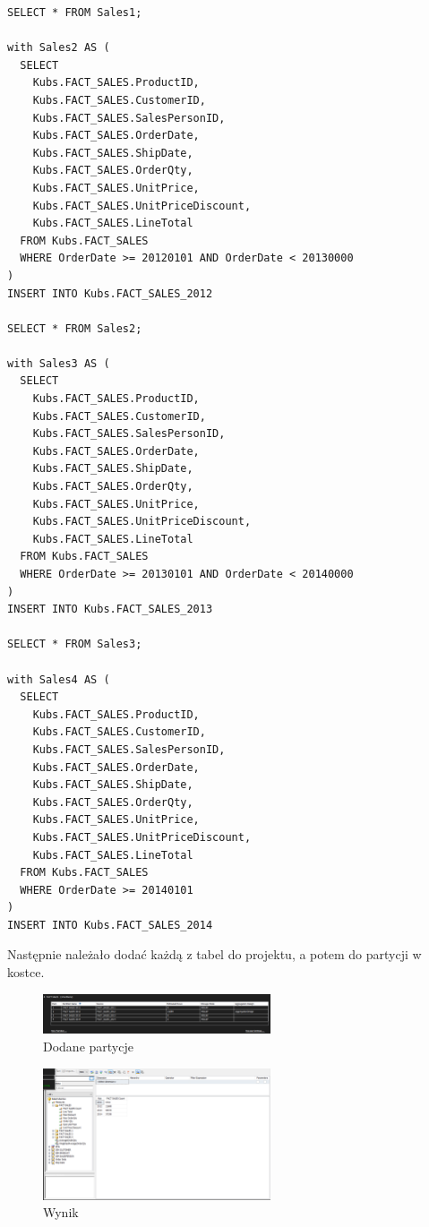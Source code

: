 \documentclass[a4paper,12pt]{article}
\begin{document}
\begin{lstlisting}[caption={Tworzenie i wypełnianie tabeli DIM\_TIME.}]
SELECT * FROM Sales1;

with Sales2 AS (
  SELECT 
    Kubs.FACT_SALES.ProductID,
    Kubs.FACT_SALES.CustomerID,
    Kubs.FACT_SALES.SalesPersonID,
    Kubs.FACT_SALES.OrderDate,
    Kubs.FACT_SALES.ShipDate,
    Kubs.FACT_SALES.OrderQty,
    Kubs.FACT_SALES.UnitPrice,
    Kubs.FACT_SALES.UnitPriceDiscount,
    Kubs.FACT_SALES.LineTotal
  FROM Kubs.FACT_SALES
  WHERE OrderDate >= 20120101 AND OrderDate < 20130000
)
INSERT INTO Kubs.FACT_SALES_2012

SELECT * FROM Sales2;

with Sales3 AS (
  SELECT 
    Kubs.FACT_SALES.ProductID,
    Kubs.FACT_SALES.CustomerID,
    Kubs.FACT_SALES.SalesPersonID,
    Kubs.FACT_SALES.OrderDate,
    Kubs.FACT_SALES.ShipDate,
    Kubs.FACT_SALES.OrderQty,
    Kubs.FACT_SALES.UnitPrice,
    Kubs.FACT_SALES.UnitPriceDiscount,
    Kubs.FACT_SALES.LineTotal
  FROM Kubs.FACT_SALES
  WHERE OrderDate >= 20130101 AND OrderDate < 20140000
)
INSERT INTO Kubs.FACT_SALES_2013

SELECT * FROM Sales3;

with Sales4 AS (
  SELECT 
    Kubs.FACT_SALES.ProductID,
    Kubs.FACT_SALES.CustomerID,
    Kubs.FACT_SALES.SalesPersonID,
    Kubs.FACT_SALES.OrderDate,
    Kubs.FACT_SALES.ShipDate,
    Kubs.FACT_SALES.OrderQty,
    Kubs.FACT_SALES.UnitPrice,
    Kubs.FACT_SALES.UnitPriceDiscount,
    Kubs.FACT_SALES.LineTotal
  FROM Kubs.FACT_SALES
  WHERE OrderDate >= 20140101
)
INSERT INTO Kubs.FACT_SALES_2014
\end{lstlisting}

Następnie należało dodać każdą z tabel do projektu, a potem do partycji w kostce.

\begin{figure}[H]
  \includegraphics[width=0.6\textwidth]{images/4a.png}
  \caption{Dodane partycje}
\end{figure}

\begin{figure}[H]
  \includegraphics[width=0.6\textwidth]{images/4a_result.png}
  \caption{Wynik}
\end{figure}
\end{document}
